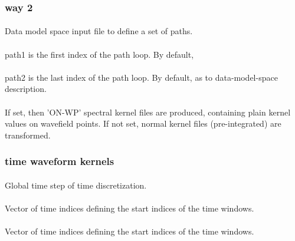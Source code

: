 \subsubsection{way 2}
\paragraph{}
Data model space input file to define a set of paths.
\paragraph{ }
path1 is the first index of the path loop. By default, 
\paragraph{ }
path2 is the last index of the path loop. By default,  as to data-model-space description.
\paragraph{}
If set, then 'ON-WP' spectral kernel files are produced, containing plain kernel values on wavefield 
points. If not set, normal kernel files (pre-integrated) are transformed.
\subsubsection{time waveform kernels}
\paragraph{}
Global time step of time discretization.
\paragraph{}
Vector of  time indices defining the start indices of the  time windows.
\paragraph{}
Vector of  time indices defining the start indices of the  time windows.
